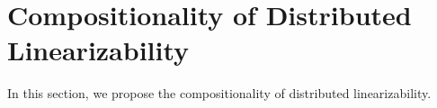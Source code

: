 
\section{Compositionality of Distributed Linearizability}
\label{sec:compositionality of distributed linearizability}

In this section, we propose the compositionality of distributed linearizability. 

